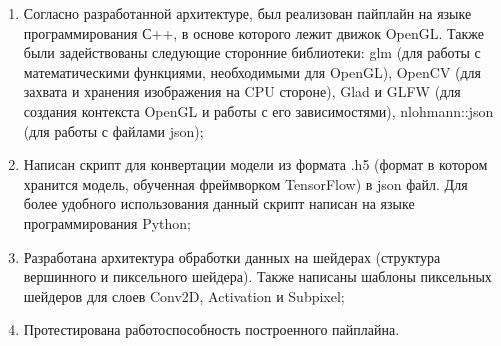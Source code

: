 \documentclass[a4paper,14pt]{extreport}
\begin{document}
\begin{enumerate}
        \item Согласно разработанной архитектуре, был реализован пайплайн на языке программирования С++, в основе которого лежит движок OpenGL. Также были задействованы следующие сторонние библиотеки: glm (для работы с математическими функциями, необходимыми для OpenGL), OpenCV (для захвата и хранения изображения на CPU стороне), Glad и GLFW (для создания контекста OpenGL и работы с его зависимостями), nlohmann::json (для работы с файлами json);
        \item Написан скрипт для конвертации модели из формата .h5 (формат в котором хранится модель, обученная фреймворком TensorFlow) в json файл. Для более удобного использования данный скрипт написан на языке программирования Python;
        \item Разработана архитектура обработки данных на шейдерах (структура вершинного и пиксельного шейдера). Также написаны шаблоны пиксельных шейдеров для слоев Conv2D, Activation и Subpixel;
        \item Протестирована работоспособность построенного пайплайна.
    \end{enumerate}
\end{document}
